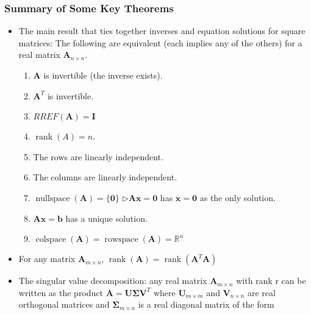 \documentclass[main.tex]{subfiles}
\begin{document}
    \subsubsection{Summary of Some Key Theorems}
    
    \begin{itemize}
    
        \item The main result that ties together inverses and equation solutions for square matrices: The following are equivalent (each implies any of the others) for a real matrix $\mathbf{A}_{n \times n}$.
        
        \begin{enumerate}
            \item $\mathbf{A}$ is invertible (the inverse exists).
            \item $\mathbf{A}^{T}$ is invertible.
            \item $RREF(\mathbf{A})=\mathbf{I}$
            \item $\operatorname{rank}(A)=n$.
            \item The rows are linearly independent.
            \item The columns are linearly independent.
            \item $\operatorname{nullspace}(\mathbf{A})=\{\mathbf{0}\}$ $\triangleright \mathbf{A} \mathbf{x}=\mathbf{0}$ has $\mathbf{x}=\mathbf{0}$ as the only solution.
            \item $\mathbf{A x}=\mathbf{b}$ has a unique solution.
            \item $\operatorname{colspace}(\mathbf{A})=\operatorname{rowspace}(\mathbf{A})=\mathbb{R}^{n}$
        \end{enumerate}
        
        \item For any matrix $\mathbf{A}_{m \times n}$, $\operatorname{rank}(\mathbf{A})=\operatorname{rank}\left(\mathbf{A}^{T} \mathbf{A}\right)$
        
        \item The singular value decomposition: any real matrix $\mathbf{A}_{m \times n}$ with rank r can be written as the product $\mathbf{A}=\mathbf{U} \boldsymbol{\Sigma} \mathbf{V}^{T}$ where $\mathbf{U}_{m \times m}$ and $\mathbf{V}_{n \times n}$ are real orthogonal matrices and $\boldsymbol{\Sigma}_{m \times n}$ is a real diagonal matrix of the form
        

\end{itemize}
\end{document}
